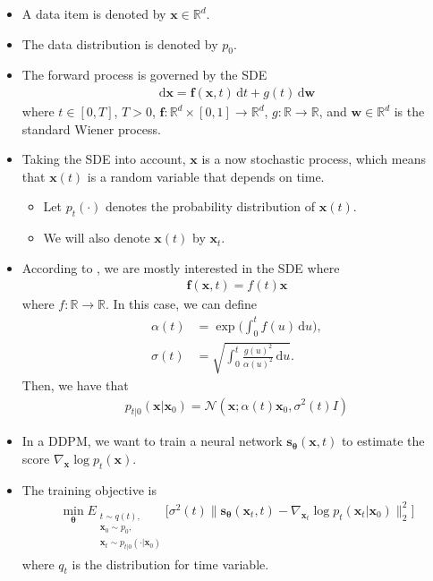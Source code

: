 \documentclass[10pt]{article}
\newcommand{\dee}{\mathrm{d}}
\newcommand{\ve}[1]{\mathbf{#1}}
\newcommand{\ves}[1]{\boldsymbol{#1}}
\newcommand{\mcal}[1]{\mathcal{#1}}
\newcommand{\Real}{\mathbb{R}}
\begin{document}
\begin{itemize}
  \item A data item is denoted by $\ve{x} \in \Real^d$.
  
  \item The data distribution is denoted by $p_0$.
    
  \item The forward process is governed by the SDE
  \begin{align*}
    \dee \ve{x} = \ve{f}(\ve{x}, t)\, \dee t + g(t)\, \dee\ve{w}
  \end{align*}
  where $t \in [0,T]$, $T > 0$, $\ve{f}: \Real^d \times [0,1] \rightarrow \Real^d$, $g: \Real \rightarrow \Real$, and $\ve{w} \in \Real^d$ is the standard Wiener process. 
  
  \item Taking the SDE into account, $\ve{x}$ is a now stochastic process, which means that $\ve{x}(t)$ is a random variable that depends on time.
  \begin{itemize}
    \item Let $p_t(\cdot)$ denotes the probability distribution of $\ve{x}(t)$.
    \item We will also denote $\ve{x}(t)$ by $\ve{x}_t$.
  \end{itemize}

  \item According to \cite{Karras:2022}, we are mostly interested in the SDE where
  \begin{align*}
    \ve{f}(\ve{x},t) = f(t)\ve{x}
  \end{align*}
  where $f:\Real \rightarrow \Real$.
  In this case, we can define
  \begin{align*}
    \alpha(t) &= \exp\bigg(\int_0^t f(u)\, \dee u\bigg), \\
    \sigma(t) &= \sqrt{\int_0^t \frac{g(u)^2}{\alpha(u)^2}\, \dee u }.
  \end{align*}
  Then, we have that
  \begin{align*}
    p_{t|0}(\ve{x}|\ve{x}_0) = \mcal{N}(\ve{x}; \alpha(t)\ve{x}_0, \sigma^2(t) I )
  \end{align*}

  \item In a DDPM, we want to train a neural network $\ve{s}_{\ves{\theta}}(\ve{x}, t)$ to estimate the score $\nabla_{\ve{x}} \log p_t(\ve{x})$.
  
  \item The training objective is
  \begin{align*}
    \min_{\ves{\theta}} E_{\substack{t \sim q(t), \\ \ve{x}_0 \sim p_0, \\ \ve{x}_t \sim p_{t|0}(\cdot|\ve{x}_0)}} \big[ \sigma^2(t) \| \ve{s}_{\ves{\theta}}(\ve{x}_t, t) - \nabla_{\ve{x}_t} \log p_t(\ve{x}_t|\ve{x}_0) \|_2^2 \big]
  \end{align*}
  where $q_t$ is the distribution for time variable.
\end{itemize}
\end{document}
